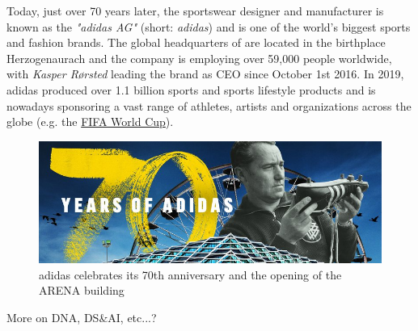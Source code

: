 Today, just over 70 years later, the sportswear designer and manufacturer is known as the \textit{"adidas AG"} (short: \textit{adidas}) and is one of the world's biggest sports and fashion brands. The global headquarters of are located in the birthplace Herzogenaurach and the company is employing over 59,000 people worldwide, with \textit{Kasper R\o rsted} leading the brand as CEO since October 1st 2016. In 2019, adidas produced over 1.1 billion sports and sports lifestyle products and is nowadays sponsoring a vast range of athletes, artists and organizations across the globe (e.g. the  \href{https://www.fifa.com/worldcup/}{FIFA World Cup\texttrademark}).

\begin{figure}[H]
\centering
  \includegraphics[width=.95\linewidth]{figures/adidas_70_years.jpg}
  \caption{adidas celebrates its 70th anniversary and the opening of the ARENA building \citep{adidas70years}}
  \label{fig:adidas_70_years}
\end{figure}


More on  DNA, DS\&AI, etc...?